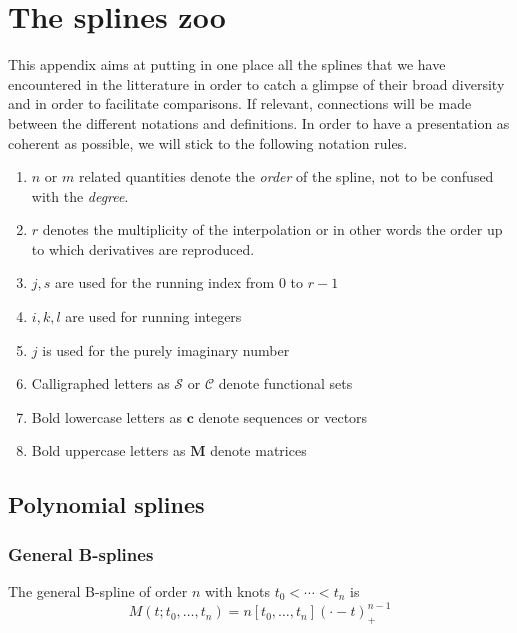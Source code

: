 \chapter{The splines zoo}\label{chapter:annexB}

This appendix aims at putting in one place all the splines that we have encountered in the litterature in order to catch 
a glimpse of their broad diversity and in order to facilitate comparisons. If relevant, connections will be made between 
the different notations and definitions.  In order to have a presentation as coherent as possible, we will stick to the 
following notation rules.

\begin{enumerate}
  \item $n$ or $m$ related quantities denote the \emph{order} of the spline, not to be confused with the \emph{degree}.  
  \item $r$ denotes the multiplicity of the interpolation or in other words the order up to which derivatives are 
    reproduced.
  \item $j,s$ are used for the running index from $0$ to $r-1$
  \item $i,k,l$ are used for running integers
  \item $j$ is used for the purely imaginary number
  \item Calligraphed letters as $\mathscr{S}$ or $\mathcal{C}$ denote functional sets
  \item Bold lowercase letters as $\bm{c}$ denote sequences or vectors
  \item Bold uppercase letters as $\bm{M}$ denote matrices
\end{enumerate}


\section{Polynomial splines}

\subsection{General B-splines}

\begin{deftn}
  The general B-spline of order $n$ with knots $t_0 < \cdots < t_n$ is
  \begin{equation}\label{def:sch-gen-bspline}
    M(t;t_0, \ldots, t_n) = n[t_0, \ldots, t_n]{(\cdot - t)}_+^{n-1}
  \end{equation}
\end{deftn}

